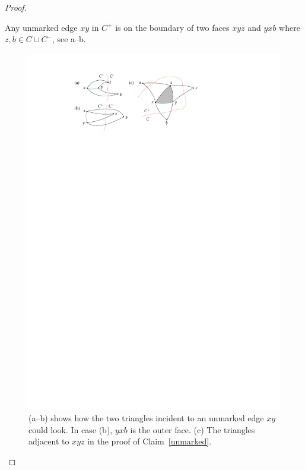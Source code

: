 \begin{proof}
        
	\begin{claimx} \label{unmarked}
	Any unmarked edge $xy$ in $C^+$ is on the boundary of two
        faces $xyz$ and $yxb$ where $z,b\in C \cup C^-$,
see a--b.
      \end{claimx}

      \begin{figure}[htb]
        \centering
        \includegraphics{figs/unmarked}
        \caption{(a--b) shows how the two triangles incident to an unmarked edge
          $xy$ could look.
          In case (b), $yxb$ is the outer face.
          (c) The triangles adjacent to $xyz$ in the proof of Claim~\ref{unmarked}.
        }
        \label{fig:two-triangles}
      \end{figure}
		

\end{proof}
